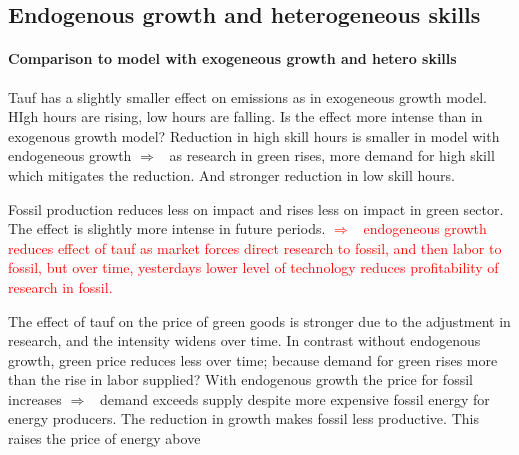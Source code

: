 \documentclass[12pt]{article}
\newcommand{\ar}{$\Rightarrow$ \ }
\newcommand{\tr}[1]{\textcolor{red}{#1}}
\begin{document}
\clearpage \newpage
\subsection{Endogenous growth and heterogeneous skills}

\paragraph{Comparison to model with exogeneous growth and hetero skills}
Tauf has a slightly smaller effect on emissions as in exogeneous growth model. HIgh hours are rising, low hours are falling. Is the effect more intense than in exogenous growth model? Reduction in high skill hours is smaller in model with endogeneous growth \ar as research in green rises, more demand for high skill which mitigates the reduction. And stronger reduction in low skill hours. 

Fossil production reduces less on impact and rises less on impact in green sector. The effect is slightly more intense in future periods. \tr{\ar endogeneous growth reduces effect of tauf as market forces direct research to fossil, and then labor to fossil, but over time, yesterdays lower level of technology reduces profitability of research in fossil.}

The effect of tauf on the price of green goods is stronger due to the adjustment in research, and the intensity widens over time. In contrast without endogenous growth, green price reduces less over time; because demand for green rises more than the rise in labor supplied? 
With endogenous growth the price for fossil increases \ar demand exceeds supply despite more expensive fossil energy for energy producers. The reduction in growth makes fossil less productive. This raises the price of energy above 
\end{document}
